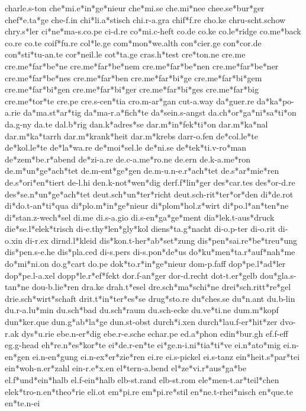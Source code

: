 charle.s-ton
che*mi.e*in*ge*nieur
che*mi.se
che.mi*nee
chee.se*bur*ger
chef*e.ta*ge
che-f.in
chi*li.a*stisch
chi.r-a.gra
chif*f.re
cho.ke
chru-scht.schow
chry.s*ler
ci*ne*ma-s.co.pe
ci-d.re
co*mi.c-heft
co.de
co.ke
co.le*ridge
co.me*back
co.re
co.te
coif*fu.re
col*le.ge
com*mon*we.alth
con*cier.ge
con*cor.de
con*sti*tu-an.te
cor*neil.le
cot*ta.ge
cras.h*test
cre*ton.ne
cre.me
cre.me*far*be*ne
cre.me*far*be*nem
cre.me*far*be*nen
cre.me*far*be*ner
cre.me*far*be*nes
cre.me*far*ben
cre.me*far*bi*ge
cre.me*far*bi*gem
cre.me*far*bi*gen
cre.me*far*bi*ger
cre.me*far*bi*ges
cre.me*far*big
cre.me*tor*te
cre.pe
cre.s-cen*tia
cro.m-ar*gan
cut-a.way
da*guer.re
da*ka*po-a.rie
da*ma.st*ar*tig
da*ma-r.a*fich*te
da*sein.s-angst
da.ch*or*ga*ni*sa*ti*on
da.g-ny
da.te
dal.b*rig
dan.k*adres*se
dar.m*in*fek*ti*on
dar.m*ka*nal
dar.m*ka*tarrh
dar.m*krank*heit
dar.m*krebs
darr-o.fen
de*col.le*te
de*kol.le*te
de*la*wa.re
de*moi*sel.le
de*ni.se
de*tek*ti.v-ro*man
de*zem*be.r*abend
de*zi-a.re
de.c-a.me*ro.ne
de.ern
de.k-a.me*ron
de.m*un*ge*ach*tet
de.m-ent*ge*gen
de.m-u.n-e.r*ach*tet
de.s*ar*mie*ren
de.s*ori*en*tiert
de-l.hi
den.k-not*wen*dig
derf.f*lin*ger
des*car.tes
des*or-d.re
des*se.n*un*ge*ach*tet
deut.sch*un*ter*richt
deut.sch-rit*ter*or*den
di*de.rot
di*do.t-an*ti*qua
di*plo.m*in*ge*nieur
di*plom*hol.z*wirt
di*po.l*an*ten*ne
di*stan.z-wech*sel
di.me
di.s-a.gio
di.s-en*ga*ge*ment
dia*lek.t-aus*druck
die*se.l*elek*trisch
di-e.thy*len*gly*kol
diens*ta.g*nacht
di-o.p-ter
di-o.rit
di-o.xin
di-r.ex
dirnd.l*kleid
dis*kon.t-her*ab*set*zung
dis*pen*sai.re*be*treu*ung
dis*pen.s-e.he
dis*pla.ced
di-s.pers
di-s.pon*de*us
do*ku*men*ta.r*auf*nah*me
do*mi*ni.on
do.g*cart
do.pe
dok*to.r*in*ge*nieur
dom-p.faff
dop*pe.l*ad*ler
dop*pe.l-a.xel
dopp*le.r*ef*fekt
dor.f-an*ger
dor-d.recht
dot-t.er*gelb
dou*gla.s-tan*ne
dou-b.lie*ren
dra.ke
drah.t*esel
dre.sch*ma*schi*ne
drei*sch.ritt*re*gel
drie.sch*wirt*schaft
drit.t*in*ter*es*se
drug*sto.re
du*ches.se
du*n.ant
du.b-lin
du.r-a.lu*min
du.sch*bad
du.sch*raum
du.sch-ecke
du.ve*ti.ne
dum.m*kopf
dun*ker.que
dun.g*ab*la*ge
dun.st-obst
durch*i.xen
durch*lau.f-er*hit*zer
dvo-r.ak
dys*u.rie
ebe.n-er*dig
ebe.r-e.sche
echar.pe
ed.a*phon
edin*bur.gh
ef.f-eff
eg.g-head
eh*re.n*es*kor*te
ei*de.r-en*te
ei*ge.n-i.ni*tia*ti*ve
ei.n*ato*mig
ei.n-en*gen
ei.n-en*gung
ei.n-ex*er*zie*ren
ei.re
ei.s-pickel
ei.s-tanz
ein*heit.s*par*tei
ein*woh-n.er*zahl
ein-r.e*x.en
el*tern-a.bend
el*ze*vi.r*aus*ga*be
el.f*und*ein*halb
el.f-ein*halb
elb-st.rand
elb-st.rom
ele*men-t.ar*teil*chen
elek*tro-n.en*theo*rie
eli.ot
em*pi.re
em*pi.re*stil
en*ne.t-rhei*nisch
en*que.te
en*te.n-ei
